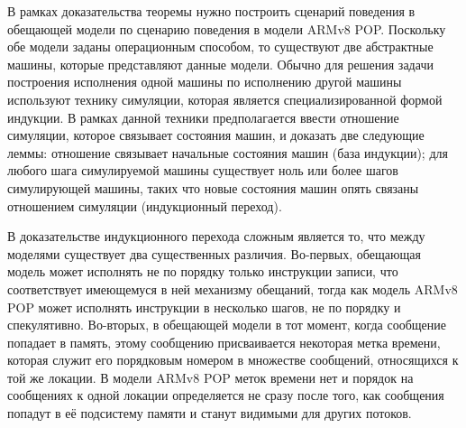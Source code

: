 В рамках доказательства теоремы нужно построить сценарий поведения в обещающей модели по сценарию поведения в модели ARMv8 POP.
Поскольку обе модели заданы операционным способом, то существуют две абстрактные машины, которые представляют данные модели.
Обычно для решения задачи построения исполнения одной машины по исполнению другой машины используют технику симуляции,
которая является специализированной формой индукции. В рамках данной техники предполагается ввести  отношение симуляции,
которое связывает состояния машин, и доказать  две следующие леммы:  отношение связывает начальные состояния машин (база индукции);
для любого шага симулируемой машины существует ноль или более шагов симулирующей машины, таких что
новые состояния машин опять связаны отношением симуляции (индукционный переход).




В доказательстве индукционного перехода сложным является то, что между моделями существует два существенных различия.
Во-первых, обещающая модель может исполнять не по порядку только инструкции записи, что соответствует имеющемуся в ней механизму обещаний,
тогда как модель ARMv8 POP может исполнять инструкции в несколько шагов, не по порядку и спекулятивно.
Во-вторых, в обещающей модели в тот момент, когда сообщение попадает в память, этому сообщению присваивается некоторая
метка времени, которая служит его порядковым номером в множестве сообщений, относящихся к той же локации. В модели ARMv8 POP
меток времени нет и порядок на сообщениях к одной локации определяется не сразу после того, как
сообщения попадут в её подсистему памяти и станут видимыми для других потоков.

